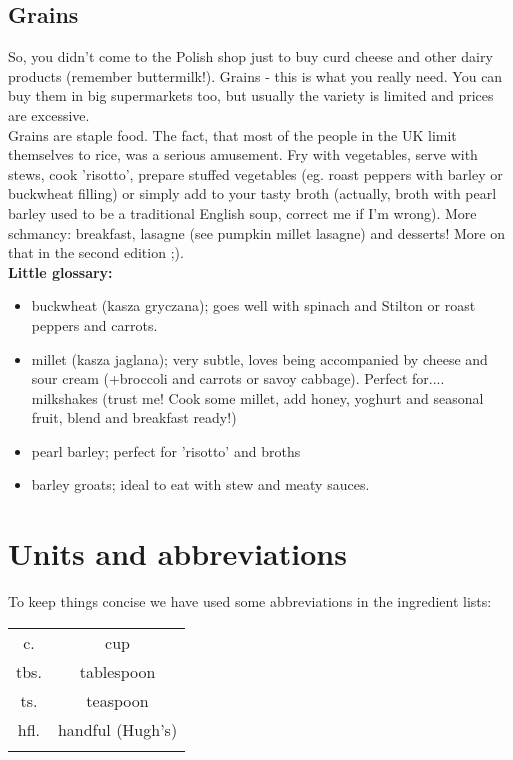 \subsection*{Grains}
So, you didn't come to the Polish shop just to buy curd cheese and other dairy products (remember buttermilk!). Grains - this is what you really need. You can buy them in big supermarkets too, but usually the variety is limited and prices are excessive.\\
Grains are staple food. The fact, that most of the people in the UK limit themselves to rice, was a serious amusement. Fry with vegetables, serve with stews, cook 'risotto', prepare stuffed vegetables (eg. roast peppers with barley or buckwheat filling) or simply add to your tasty broth (actually, broth with pearl barley used to be a traditional English soup, correct me if I'm wrong). More schmancy: breakfast, lasagne (see pumpkin millet lasagne) and desserts! More on that in the second edition ;).\\
\textbf{Little glossary:}

\begin{itemize}
    \setlength\itemsep{0.1mm}
    \item buckwheat (kasza gryczana); goes well with spinach and Stilton or roast peppers and carrots. 
    \item millet (kasza jaglana); very subtle, loves being accompanied by cheese and sour cream (+broccoli and carrots or savoy cabbage). Perfect for.... milkshakes (trust me! Cook some millet, add honey, yoghurt and seasonal fruit, blend and breakfast ready!) 
    \item pearl barley; perfect for 'risotto' and broths
    \item barley groats; ideal to eat with stew and meaty sauces. 
\end{itemize}

\section*{Units and abbreviations}
To keep things concise we have used some abbreviations in the ingredient lists:
\begin{table}[h]
\centering
\begin{tabular}{cc}
    c.	& cup                     \\
    tbs. & tablespoon                     \\
    ts.	& teaspoon                    \\
    hfl. & handful (Hugh's) \\
    \multicolumn{1}{l}{} & \multicolumn{1}{l}{}
\end{tabular}
\end{table}